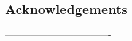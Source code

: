 \documentclass[a0,portrait]{a0poster}
\begin{document}
\begin{mdframed}[style=MyFrame]
\begin{multicols}{2}
\section*{Acknowledgements}



-------------------------------------
\end{multicols}
\begin{center}
\color{SteelBlue}{NZSA Conference, Victoria University of Wellington, December 2024}
\end{center}
\end{mdframed}
\end{document}
